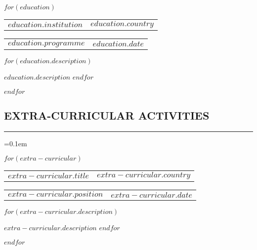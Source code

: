 \documentclass[10pt,letterpaper]{article}
\makeatletter
\newcommand{\headerrow}[2]
{\begin{tabular*}{\linewidth}{l@{\extracolsep{\fill}}r}
	#1 &
	#2 \\
\end{tabular*}}
\makeatother
\begin{document}
    $for(education)$
	\headerrow
		{\textbf{$education.institution$}}
		{\textbf{$education.country$}}
	\vspace{-5pt}
	\headerrow
		{$education.programme$}
		{\emph{$education.date$}}
    \begin{itemize*}
        $for(education.description)$
        \item $education.description$
        $endfor$
    \end{itemize*}
	\vspace{-4pt}
    $endfor$

\subsection*{EXTRA-CURRICULAR ACTIVITIES}
\vspace{-0.2em}
\hrule
\vspace{0.4em}
\parskip=0.1em

    $for(extra-curricular)$
	\headerrow
		{\textbf{$extra-curricular.title$}}
		{\textbf{$extra-curricular.country$}}
	\vspace{-5pt}
	\headerrow
        {\emph{$extra-curricular.position$}}
		{\emph{$extra-curricular.date$}}
    \begin{itemize*}
        $for(extra-curricular.description)$
        \item $extra-curricular.description$
        $endfor$
    \end{itemize*}
	\vspace{-4pt}
    $endfor$
\end{document}
